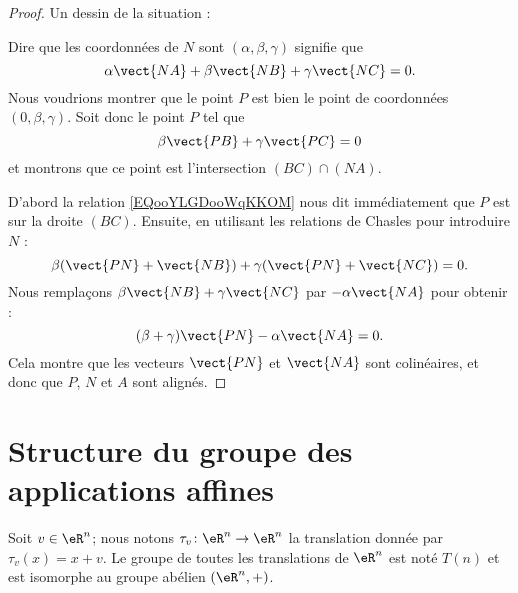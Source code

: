 \begin{proof}
    Un dessin de la situation :

    \begin{center}
        
    \end{center}

    Dire que les coordonnées de \( N\) sont \( (\alpha,\beta,\gamma)\) signifie que
    \begin{equation}
        \alpha\vect{ NA }+\beta\vect{ NB }+\gamma\vect{ NC }=0.
    \end{equation}
    Nous voudrions montrer que le point \( P\) est bien le point de coordonnées \( (0,\beta,\gamma)\). Soit donc le point \( P\) tel que
    \begin{equation}        \label{EQooYLGDooWqKKOM}
        \beta\vect{ PB }+\gamma\vect{ PC }=0
    \end{equation}
    et montrons que ce point est l'intersection \( (BC)\cap (NA)\).

    D'abord la relation \eqref{EQooYLGDooWqKKOM} nous dit immédiatement que \( P\) est sur la droite \( (BC)\). Ensuite, en utilisant les relations de Chasles pour introduire \( N\) :
    \begin{equation}
        \beta(\vect{ PN }+\vect{ NB })+\gamma(\vect{ PN }+\vect{ NC })=0.
    \end{equation}
    Nous remplaçons \( \beta\vect{ NB }+\gamma\vect{ NC }\) par \( -\alpha\vect{ NA }\) pour obtenir :
    \begin{equation}
        (\beta+\gamma)\vect{ PN }-\alpha\vect{ NA }=0.
    \end{equation}
    Cela montre que les vecteurs \( \vect{ PN }\) et \( \vect{ NA }\) sont colinéaires, et donc que \( P\), \( N\) et \( A\) sont alignés.
\end{proof}

\section{Structure du groupe des applications affines}

Soit \( v\in \eR^n\); nous notons \( \tau_v\colon \eR^n\to \eR^n\) la translation donnée par \( \tau_v(x)=x+v\). Le groupe de toutes les translations de \( \eR^n\) est noté \( T(n)\) et est isomorphe au groupe abélien \( (\eR^n,+)\).

